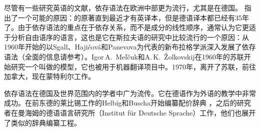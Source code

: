 尽管有一些研究英语的文献\citep{Anderson71a-u,Hudson84a-u}，依存语法在欧洲中部更为流行，尤其是在德国\citep[--57]{Engel96a}。 \citet[]{AF2010a}指出了一个可能的原因：\tes 的原著直到最近才有英译本\citep{Tesniere2015a-not-crossreferenced}，但是德语译本都已经有35年了\citep{Tesniere80a-u}。由于依存语法的重点在于依存关系，而不是成分的线性顺序，通常认为它更适于分析自由语序的语言，这也是它在斯拉夫语的研究中比较流行的一个原因：从1960年开始的以Sgall、Hajičová和Panevova为代表的新布拉格学派深入发展了依存语法（全面的信息请参考\citet{HS2003a-u}）。Igor\,A.\ Meľčuk和A.\,K.\ Žolkovskij在1960年的苏联开始研究一个叫做\mttc 的模型，它也被用于机器翻译项目中\citep{Melcuk64a-u,Melcuk81a,Melcuk88a-u,Kahane2003a-u}。1970年，\mel 离开了苏联，前往加拿大，现在蒙特利尔工作。

依存语法在德国及世界范围内的学者中广为流传。它在德语作为外语的教学中非常成功\citep{HB69a-u,HB98a}。在前东德的莱比锡工作的Helbig和Buscha开始编纂配价辞典\citep{HS69a-u} ，之后的研究者在曼海姆的德语语言研究所（Institut für Deutsche Sprache）工作，他们也展开了类似的辞典编纂工程\citep{SKSR2004a-u}。

